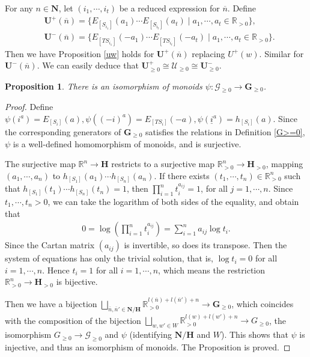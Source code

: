 \documentclass[12pt]{amsart}
\newtheorem{proposition}[theorem]{Proposition}
\begin{document}
For any $n\in \mathbf{N}$, let $(i_1,\cdots,i_t)$ be a reduced expression for $\overline{n}$.
Define 
\begin{align*}
    &\mathbf{U}^+(\overline{n})=\{ E_{[S_{i_1}]}(a_1)\cdots E_{[S_{i_t}]}(a_t)\mid a_1,\cdots,a_t \in \mathbb{R}_{>0}  \},\\
     &\mathbf{U}^-(\overline{n})=\{ E_{[TS_{i_1}]}(-a_1)\cdots E_{[TS_{i_t}]}(-a_t)\mid a_1,\cdots,a_t \in \mathbb{R}_{>0}  \}.
\end{align*}
Then we have Proposition \ref{uw} holds for $\mathbf{U}^+(\overline{n})$ replacing $U^+(w)$.
Similar for $\mathbf{U}^-(\overline{n})$.
We can easily deduce that $\mathbf{U}^+_{\geq 0}\cong \mathcal{U}_{\geq 0}\cong \mathbf{U}^-_{\geq 0}$.


\begin{proposition}
    There is an isomorphism of monoids $\psi:\mathcal{G}_{\geq 0}\rightarrow \mathbf{G}_{\geq 0}$.
\end{proposition}

\begin{proof}
    Define $\psi(i^a)=E_{[S_i]}(a),\psi((-i)^a)=E_{[TS_i]}(-a),\psi(\underline{i}^a)=h_{[S_i]}(a)$. 
    Since the corresponding generators of $\mathbf{G}_{\geq 0}$ satisfies the relations in Definition \ref{G>=0}, $\psi$ is a well-defined homomorphism of monoids, and is surjective. 

    The surjective map $\mathbb{R}^n \rightarrow \mathbf{H}$ restricts to a surjective map $\mathbb{R}^n_{>0}\rightarrow \mathbf{H}_{>0}$, mapping $(a_1,\cdots,a_n)$ to $h_{[S_1]}(a_1)\cdots h_{[S_n]}(a_n)$.
    If there exists $(t_1,\cdots,t_n)\in \mathbb{R}^n_{>0}$ such that $h_{[S_1]}(t_1)\cdots h_{[S_n]}(t_n)=1$, then $\prod\limits_{i=1}^n t_i^{a_{ij}} = 1$, for all $ j=1,\cdots,n$.
    Since $t_1,\cdots,t_n>0$, we can take the logarithm of both sides of the equality, and obtain that 
    \begin{align*}
        0=\operatorname{log}(\prod\limits_{i=1}^n t_i^{a_{ij}})=\sum_{i=1}^n a_{ij}\operatorname{log} t_i.
    \end{align*}  
    Since the Cartan matrix $(a_{ij})$ is invertible, so does its transpose.
    Then the system of equations has only the trivial solution, that is, $\operatorname{log}t_i=0$ for all $i=1,\cdots,n$. 
    Hence $t_i=1$ for all $i=1,\cdots,n$, which means the restriction $\mathbb{R}^n_{>0}\rightarrow \mathbf{H}_{>0}$ is bijective.

    Then we have a bijection $\bigsqcup_{\overline{n},\overline{n}'\in \mathbf{N}/\mathbf{H}} \mathbb{R}_{>0}^{l(\overline{n})+l(\overline{n}')+n}\rightarrow \mathbf{G}_{\geq 0}$, which coincides with the composition of the bijection $\bigsqcup_{w,w'\in W} \mathbb{R}_{>0}^{l(w)+l(w')+n}\rightarrow G_{\geq 0}$, the isomorphism $G_{\geq 0}\rightarrow \mathcal{G}_{\geq 0}$ and $\psi$ (identifying $\mathbf{N}/\mathbf{H}$ and $W$).
    This shows that $\psi$ is injective, and thus an isomorphism of monoids. 
    The Proposition is proved.
\end{proof}
\end{document}
